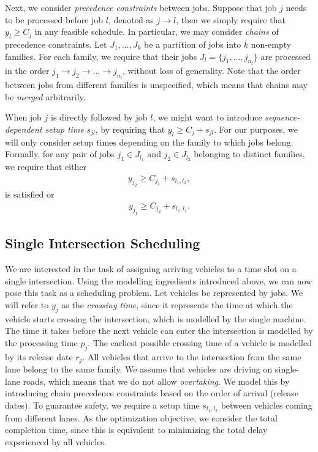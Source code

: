 \documentclass{article}
\theoremstyle{definition}
\begin{document}
Next, we consider \textit{precedence constraints} between jobs. Suppose that job
$j$ needs to be processed before job $l$, denoted as $j \rightarrow{} l$, then
we simply require that $y_{l} \geq C_{j}$ in any feasible schedule. In
particular, we may consider \textit{chains} of precedence constraints. Let
$J_{1}, \dots, J_{k}$ be a partition of jobs into $k$ non-empty families. For
each family, we require that their jobs $J_{l} = \{ j_{1}, \dots, j_{n_{l}}\}$
are processed in the order
$j_{1} \rightarrow{} j_{2} \rightarrow{} \dots \rightarrow{} j_{n_{l}}$, without
loss of generality. Note that the order between jobs from different families is
unspecified, which means that chains may be \textit{merged} arbitrarily.

When job $j$ is directly followed by job $l$, we might want to introduce
\textit{sequence-dependent setup time} $s_{jl}$, by requiring that
$y_{l} \geq C_{j} + s_{jl}$. For our purposes, we will only consider setup times
depending on the family to which jobs belong. Formally, for any pair of jobs
$j_{1} \in J_{l_{1}}$ and $j_{2} \in J_{l_{2}}$ belonging to distinct families, we
require that either
\begin{align*}
y_{j_{2}} \geq C_{j_{1}} + s_{l_{1},l_{2}} ,
\end{align*}
is satisfied or
\begin{align*}
y_{j_{1}} \geq C_{j_{2}} + s_{l_{2},l_{1}} .
\end{align*}

\subsection{Single Intersection Scheduling}

We are interested in the task of assigning arriving vehicles to a time slot on a
single intersection. Using the modelling ingredients introduced above, we can
now pose this task as a scheduling problem. Let vehicles be represented by jobs.
We will refer to $y_{j}$ as the \textit{crossing time}, since it represents the
time at which the vehicle starts crossing the intersection, which is modelled by
the single machine. The time it takes before the next vehicle can enter the
intersection is modelled by the processing time $p_{j}$. The earliest possible
crossing time of a vehicle is modelled by its release date $r_{j}$. All vehicles
that arrive to the intersection from the same lane belong to the same family. We
assume that vehicles are driving on single-lane roads, which means that we do
not allow \textit{overtaking}. We model this by introducing chain precedence
constraints based on the order of arrival (release dates). To guarantee safety,
we require a setup time $s_{l_{1},l_{2}}$ between vehicles coming from different
lanes. As the optimization objective, we consider the total completion time,
since this is equivalent to minimizing the total delay experienced by all
vehicles.
\end{document}
